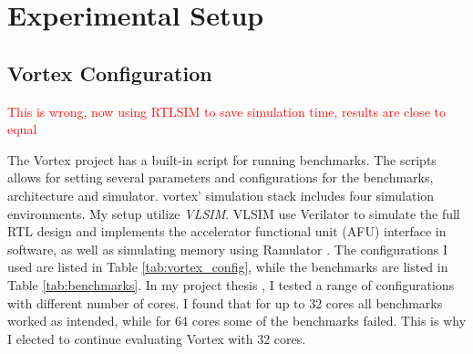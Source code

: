 \chapter{Experimental Setup} \label{chap:exp_setup}

\section{Vortex Configuration}

\textcolor{red}{This is wrong, now using RTLSIM to save simulation time, results are close to equal}

The Vortex project has a built-in script for running benchmarks. The scripts allows for setting several parameters and configurations for the benchmarks, architecture and simulator. \Gls{vortex}' simulation stack includes four simulation environments. My setup utilize \textit{VLSIM}. VLSIM use Verilator \cite{verilator} to simulate the full RTL design and implements the accelerator functional unit (AFU) interface in software, as well as simulating memory using Ramulator \cite{Ramulator}. The configurations I used are listed in Table \ref{tab:vortex_config}, while the benchmarks are listed in Table \ref{tab:benchmarks}. In my project thesis \cite{Aurud_Project}, I tested a range of configurations with different number of cores. I found that for up to 32 cores all benchmarks worked as intended, while for 64 cores some of the benchmarks failed. This is why I elected to continue evaluating Vortex with 32 cores.

